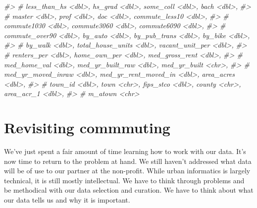 \documentclass[
]{book}
\newenvironment{Shaded}{\begin{snugshade}}{\end{snugshade}}
\newcommand{\CommentTok}[1]{\textcolor[rgb]{0.56,0.35,0.01}{\textit{#1}}}
\begin{document}
\begin{Shaded}
\begin{Highlighting}[]
\CommentTok{\#\textgreater{} \#   less\_than\_hs \textless{}dbl\textgreater{}, hs\_grad \textless{}dbl\textgreater{}, some\_coll \textless{}dbl\textgreater{}, bach \textless{}dbl\textgreater{},}
\CommentTok{\#\textgreater{} \#   master \textless{}dbl\textgreater{}, prof \textless{}dbl\textgreater{}, doc \textless{}dbl\textgreater{}, commute\_less10 \textless{}dbl\textgreater{},}
\CommentTok{\#\textgreater{} \#   commute1030 \textless{}dbl\textgreater{}, commute3060 \textless{}dbl\textgreater{}, commute6090 \textless{}dbl\textgreater{},}
\CommentTok{\#\textgreater{} \#   commute\_over90 \textless{}dbl\textgreater{}, by\_auto \textless{}dbl\textgreater{}, by\_pub\_trans \textless{}dbl\textgreater{}, by\_bike \textless{}dbl\textgreater{},}
\CommentTok{\#\textgreater{} \#   by\_walk \textless{}dbl\textgreater{}, total\_house\_units \textless{}dbl\textgreater{}, vacant\_unit\_per \textless{}dbl\textgreater{},}
\CommentTok{\#\textgreater{} \#   renters\_per \textless{}dbl\textgreater{}, home\_own\_per \textless{}dbl\textgreater{}, med\_gross\_rent \textless{}dbl\textgreater{},}
\CommentTok{\#\textgreater{} \#   med\_home\_val \textless{}dbl\textgreater{}, med\_yr\_built\_raw \textless{}dbl\textgreater{}, med\_yr\_built \textless{}chr\textgreater{},}
\CommentTok{\#\textgreater{} \#   med\_yr\_moved\_inraw \textless{}dbl\textgreater{}, med\_yr\_rent\_moved\_in \textless{}dbl\textgreater{}, area\_acres \textless{}dbl\textgreater{},}
\CommentTok{\#\textgreater{} \#   town\_id \textless{}dbl\textgreater{}, town \textless{}chr\textgreater{}, fips\_stco \textless{}dbl\textgreater{}, county \textless{}chr\textgreater{}, area\_acr\_1 \textless{}dbl\textgreater{},}
\CommentTok{\#\textgreater{} \#   m\_atown \textless{}chr\textgreater{}}
\end{Highlighting}
\end{Shaded}

\hypertarget{revisiting-commmuting}{%
\section{Revisiting commmuting}\label{revisiting-commmuting}}

We've just spent a fair amount of time learning how to work with our data. It's now time to return to the problem at hand. We still haven't addressed what data will be of use to our partner at the non-profit. While urban informatics is largely technical, it is still mostly intellectual. We have to think through problems and be methodical with our data selection and curation. We have to think about what our data tells us and why it is important.
\end{document}
